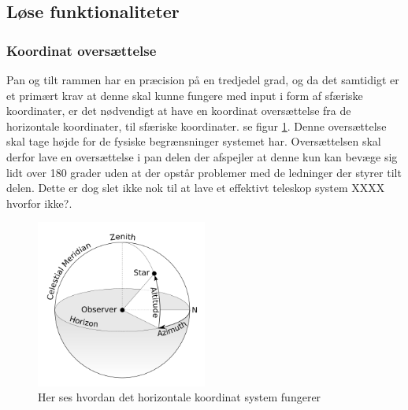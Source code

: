 
\subsection{Løse funktionaliteter}

\subsubsection{Koordinat oversættelse}

\label{subsec:koordinat}

Pan og tilt rammen har en præcision på en tredjedel grad, og da det samtidigt er et primært krav at denne skal kunne fungere med input i form af sfæriske koordinater, er det nødvendigt at have en koordinat oversættelse fra de horizontale koordinater, til sfæriske koordinater. se figur \ref{fig:Horizontal}. Denne oversættelse skal tage højde for de fysiske begrænsninger systemet har. Oversættelsen skal derfor lave en oversættelse i pan delen der afspejler at denne kun kan bevæge sig lidt over 180 grader uden at der opstår problemer med de ledninger der styrer tilt delen. Dette er dog slet ikke nok til at lave et effektivt teleskop system XXXX hvorfor ikke?.
\begin{figure}[!h]
	\begin{center}
		\includegraphics[width=0.5\textwidth]{Billeder/Horizontal.png}
	\end{center}		
	\caption{Her ses hvordan det horizontale koordinat system fungerer}
	\label{fig:Horizontal}
\end{figure}

